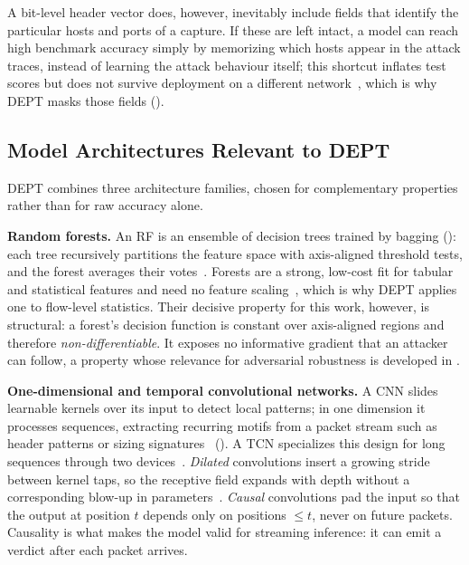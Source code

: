 A bit-level header vector does, however, inevitably include fields that identify the
particular hosts and ports of a capture. If these are left intact, a model can reach high
benchmark accuracy simply by memorizing which hosts appear in the attack traces, instead
of learning the attack behaviour itself; this shortcut inflates test scores but does not
survive deployment on a different network~\cite{arp2022dos,apruzzese2023sok}, which is
why DEPT masks those fields ().

\subsection{Model Architectures Relevant to DEPT}\label{subsec:bg-architectures}
DEPT combines three architecture families, chosen for complementary properties rather than
for raw accuracy alone.

\textbf{Random forests.}
An \ac{RF} is an ensemble of decision trees trained by bagging ():
each tree recursively partitions the feature space with axis-aligned threshold tests, and
the forest averages their votes~\cite{breiman2001random,breiman1996bagging}. Forests are a
strong, low-cost fit for tabular and statistical features and need no feature
scaling~\cite{lucas2023comprehensive}, which is why DEPT applies one to flow-level
statistics. Their decisive property for this work, however, is
structural: a forest's decision function is constant over axis-aligned regions and
therefore \emph{non-differentiable}. It exposes no informative gradient that an attacker
can follow, a property whose relevance for adversarial robustness is developed in
.

\textbf{One-dimensional and temporal convolutional networks.}
A \ac{CNN} slides learnable kernels over its input to detect local patterns; in one
dimension it processes sequences, extracting recurring motifs from a packet stream such as
header patterns or sizing signatures~\cite{wang2017end,lotfollahi2020deep}
(). A \ac{TCN} specializes this design for long sequences through two
devices~\cite{bai2018empirical}. \emph{Dilated} convolutions insert a growing stride
between kernel taps, so the receptive field expands with depth without a corresponding
blow-up in parameters~\cite{oord2016wavenet}. \emph{Causal} convolutions pad the input so
that the output at position $t$ depends only on positions $\leq t$, never on future
packets. Causality is what makes the model valid for streaming inference: it can emit a
verdict after each packet arrives.

